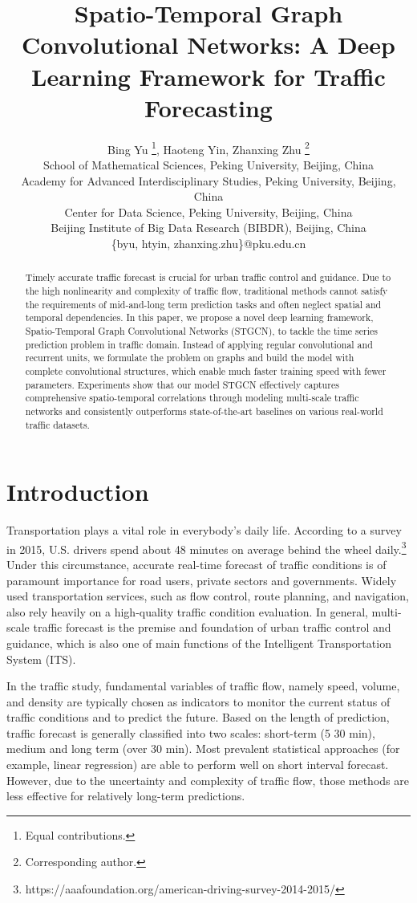 \documentclass{article}
\title{Spatio-Temporal Graph Convolutional Networks: A Deep Learning Framework for Traffic Forecasting}
\author{
Bing Yu \thanks{Equal contributions.}, 
Haoteng Yin, 
Zhanxing Zhu \thanks{Corresponding author.}
\\ 
 School of Mathematical Sciences, Peking University, Beijing, China\\
 Academy for Advanced Interdisciplinary Studies, Peking University, Beijing, China\\
 Center for Data Science, Peking University, Beijing, China\\
 Beijing Institute of Big Data Research (BIBDR), Beijing, China\\
\{byu, htyin, zhanxing.zhu\}@pku.edu.cn
}
\begin{document}
\maketitle

\begin{abstract}
Timely accurate traffic forecast is crucial for urban traffic control and guidance. Due to the high nonlinearity and complexity of traffic flow, traditional methods cannot satisfy the requirements of mid-and-long term prediction tasks and often neglect spatial and temporal dependencies. In this paper, we propose a novel deep learning framework, Spatio-Temporal Graph Convolutional Networks (STGCN), to tackle the time series prediction problem in traffic domain. Instead of applying regular convolutional and recurrent units, we formulate the problem on graphs and build the model with complete convolutional structures, which enable much faster training speed with fewer parameters. Experiments show that our model STGCN effectively captures comprehensive spatio-temporal correlations through modeling multi-scale traffic networks and consistently outperforms state-of-the-art baselines on various real-world traffic datasets.
\end{abstract}

\section{Introduction}
Transportation plays a vital role in everybody's daily life. According to a survey in 2015, U.S. drivers spend about 48 minutes on average behind the wheel daily.\footnote{https://aaafoundation.org/american-driving-survey-2014-2015/} Under this circumstance, accurate real-time forecast of traffic conditions is of paramount importance for road users, private sectors and governments. Widely used transportation services, such as flow control, route planning, and navigation, also rely heavily on a high-quality traffic condition evaluation. In general, multi-scale traffic forecast is the premise and foundation of urban traffic control and guidance, which is also one of main functions of the Intelligent Transportation System (ITS). 

In the traffic study, fundamental variables of traffic flow, namely speed, volume, and density are typically chosen as indicators to monitor the current status of traffic conditions and to predict the future. Based on the length of prediction, traffic forecast is generally classified into two scales: short-term (5  30 min), medium and long term (over 30 min). Most prevalent statistical approaches (for example, linear regression) are able to perform well on short interval forecast. However, due to the uncertainty and complexity of traffic flow, those methods are less effective for relatively long-term predictions.
\end{document}
